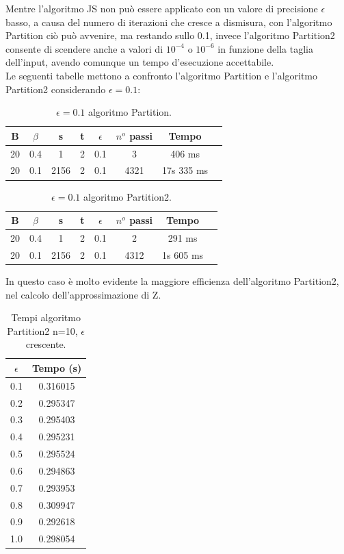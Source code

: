 Mentre l'algoritmo JS non può essere applicato con un valore di precisione $\epsilon$ basso, a causa del numero di iterazioni che cresce a dismisura, con l'algoritmo Partition ciò può avvenire, ma restando sullo 0.1, invece l'algoritmo Partition2 consente di scendere anche a valori di $10^{-4}$ o $10^{-6}$ in funzione della taglia dell'input, avendo comunque un tempo d'esecuzione accettabile.\\
Le seguenti tabelle mettono a confronto l'algoritmo Partition e l'algoritmo Partition2 considerando $\epsilon = 0.1$:
\begin{table}[]
	\centering
	\begin{tabular}{|c|c|c|c|c|c|c|c|}
		\hline
		B  & $\beta$ & s     & t  & $\epsilon$ & $n^o$ passi & Tempo        \\ \hline
		20 & 0.4     & 1 & 2 & 0.1        & 3  & 406 ms \\ \hline
		20 & 0.1     & 2156     & 2  & 0.1        & 4321        & 17s 335 ms       \\ \hline
	\end{tabular}
	\caption{$\epsilon = 0.1$ algoritmo Partition.}\label{tab:3}
\end{table}
\begin{table}[]
	\centering
	\begin{tabular}{|c|c|c|c|c|c|c|c|}
		\hline
		B  & $\beta$ & s     & t  & $\epsilon$ & $n^o$ passi & Tempo        \\ \hline
		20 & 0.4     & 1 & 2 & 0.1        & 2  & 291 ms \\ \hline
		20 & 0.1     & 2156     & 2  & 0.1        & 4312       & 1s 605 ms       \\ \hline
	\end{tabular}
	\caption{$\epsilon = 0.1$ algoritmo Partition2.}\label{tab:4}
\end{table}
In questo caso è molto evidente la maggiore efficienza dell'algoritmo Partition2, nel calcolo dell'approssimazione di Z.
\begin{table}[]
	\centering
	\begin{tabular}{|c|c|}
		\hline
		$\epsilon$ & Tempo (s)\\ \hline
		0.1        & 0.316015 \\ \hline
		0.2        & 0.295347 \\ \hline
		0.3        & 0.295403 \\ \hline
		0.4        & 0.295231 \\ \hline
		0.5        & 0.295524 \\ \hline
		0.6        & 0.294863 \\ \hline
		0.7        & 0.293953 \\ \hline
		0.8        & 0.309947 \\ \hline
		0.9        & 0.292618 \\ \hline
		1.0        & 0.298054 \\ \hline
	\end{tabular}
	\caption{Tempi algoritmo Partition2 n=10, $\epsilon$ crescente.}\label{tab:eps}
\end{table}
